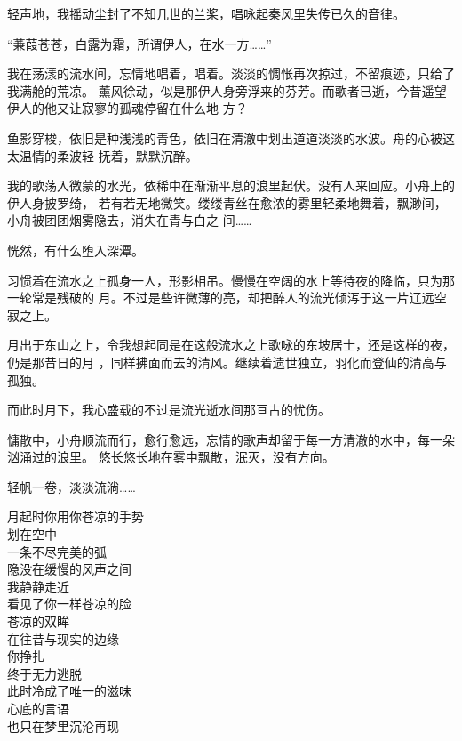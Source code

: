 \documentclass[12pt,a4paper]{article}
\begin{document}
		轻声地，我摇动尘封了不知几世的兰桨，唱咏起秦风里失传已久的音律。

		“蒹葭苍苍，白露为霜，所谓伊人，在水一方……”

		我在荡漾的流水间，忘情地唱着，唱着。淡淡的惆怅再次掠过，不留痕迹，只给了我满舱的荒凉。
	薰风徐动，似是那伊人身旁浮来的芬芳。而歌者已逝，今昔遥望伊人的他又让寂寥的孤魂停留在什么地
	方？

		鱼影穿梭，依旧是种浅浅的青色，依旧在清澈中划出道道淡淡的水波。舟的心被这太温情的柔波轻
	抚着，默默沉醉。

		我的歌荡入微蒙的水光，依稀中在渐渐平息的浪里起伏。没有人来回应。小舟上的伊人身披罗绮，
	若有若无地微笑。缕缕青丝在愈浓的雾里轻柔地舞着，飘渺间，小舟被团团烟雾隐去，消失在青与白之
	间……

		恍然，有什么堕入深潭。

		习惯着在流水之上孤身一人，形影相吊。慢慢在空阔的水上等待夜的降临，只为那一轮常是残破的
	月。不过是些许微薄的亮，却把醉人的流光倾泻于这一片辽远空寂之上。

		月出于东山之上，令我想起同是在这般流水之上歌咏的东坡居士，还是这样的夜，仍是那昔日的月
	，同样拂面而去的清风。继续着遗世独立，羽化而登仙的清高与孤独。

		而此时月下，我心盛载的不过是流光逝水间那亘古的忧伤。

		慵散中，小舟顺流而行，愈行愈远，忘情的歌声却留于每一方清澈的水中，每一朵汹涌过的浪里。
	悠长悠长地在雾中飘散，泯灭，没有方向。

		轻帆一卷，淡淡流淌……

	\endwriting



		\longpoem{}{}{}
		月起时你用你苍凉的手势 \\
		划在空中 \\
		一条不尽完美的弧 \\
		隐没在缓慢的风声之间 \\
		我静静走近 \\
		看见了你一样苍凉的脸 \\
		苍凉的双眸 \\
		在往昔与现实的边缘 \\
		你挣扎 \\
		终于无力逃脱 \\
		此时冷成了唯一的滋味 \\
		心底的言语 \\
		也只在梦里沉沦再现
		\endlongpoem
	\endwriting


\end{document}
